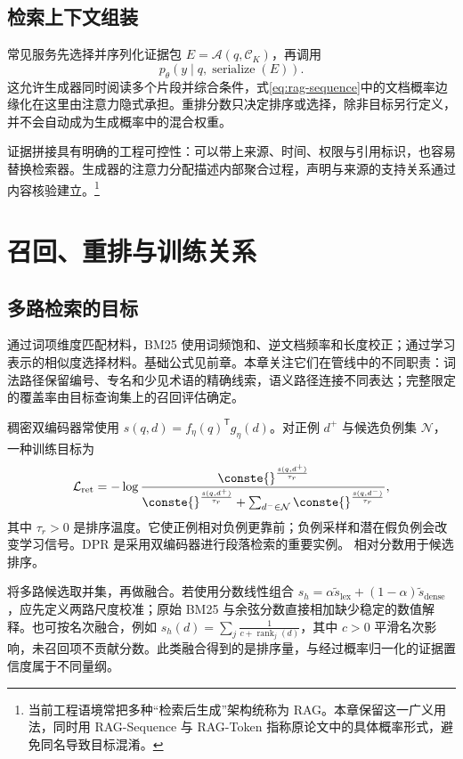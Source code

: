 \documentclass[../textbook.tex]{subfiles}
\begin{document}
\subsection{检索上下文组装}
常见服务先选择并序列化证据包 $E=\mathcal A(q,\mathcal C_K)$，再调用
\begin{equation}
 p_\theta(y\mid q,\operatorname{serialize}(E)).
\end{equation}
这允许生成器同时阅读多个片段并综合条件，式\eqref{eq:rag-sequence}中的文档概率边缘化在这里由注意力隐式承担。重排分数只决定排序或选择，除非目标另行定义，并不会自动成为生成概率中的混合权重。

证据拼接具有明确的工程可控性：可以带上来源、时间、权限与引用标识，也容易替换检索器。生成器的注意力分配描述内部聚合过程，声明与来源的支持关系通过内容核验建立。\footnote{当前工程语境常把多种“检索后生成”架构统称为 RAG。本章保留这一广义用法，同时用 RAG-Sequence 与 RAG-Token 指称原论文中的具体概率形式，避免同名导致目标混淆。}

\section{召回、重排与训练关系}

\subsection{多路检索的目标}
通过词项维度匹配材料，BM25 使用词频饱和、逆文档频率和长度校正；通过学习表示的相似度选择材料。基础公式见前章。本章关注它们在管线中的不同职责：词法路径保留编号、专名和少见术语的精确线索，语义路径连接不同表达；完整限定的覆盖率由目标查询集上的召回评估确定。

稠密双编码器常使用 $s(q,d)=f_\eta(q)^{\mathsf{T}} g_\eta(d)$。对正例 $d^+$ 与候选负例集 $\mathcal N$，一种训练目标为
\begin{equation}
 \mathcal L_{\mathrm{ret}}=-\log
 \frac{\conste{}^{\frac{s(q,d^+)}{\tau_r}}}
 {\conste{}^{\frac{s(q,d^+)}{\tau_r}}+\sum_{d^-\in\mathcal N}\conste{}^{\frac{s(q,d^-)}{\tau_r}}},
\end{equation}
其中 $\tau_r>0$ 是排序温度。它使正例相对负例更靠前；负例采样和潜在假负例会改变学习信号。DPR 是采用双编码器进行段落检索的重要实例。\cite{karpukhin2020dpr} 相对分数用于候选排序。

将多路候选取并集，再做融合。若使用分数线性组合 $s_h=\alpha\widetilde s_{\mathrm{lex}}+(1-\alpha)\widetilde s_{\mathrm{dense}}$，应先定义两路尺度校准；原始 BM25 与余弦分数直接相加缺少稳定的数值解释。也可按名次融合，例如 $s_h(d)=\sum_j\frac{1}{c+\operatorname{rank}_j(d)}$，其中 $c>0$ 平滑名次影响，未召回项不贡献分数。此类融合得到的是排序量，与经过概率归一化的证据置信度属于不同量纲。
\end{document}
